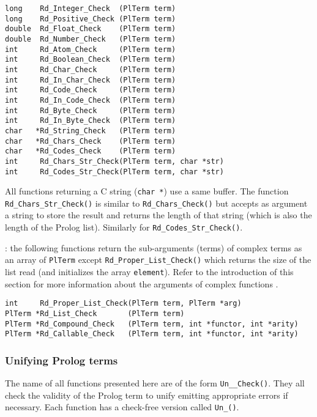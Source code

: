 \begin{Indentation}
\begin{verbatim}
long    Rd_Integer_Check  (PlTerm term)
long    Rd_Positive_Check (PlTerm term)
double  Rd_Float_Check    (PlTerm term)
double  Rd_Number_Check   (PlTerm term)
int     Rd_Atom_Check     (PlTerm term)
int     Rd_Boolean_Check  (PlTerm term)
int     Rd_Char_Check     (PlTerm term)
int     Rd_In_Char_Check  (PlTerm term)
int     Rd_Code_Check     (PlTerm term)
int     Rd_In_Code_Check  (PlTerm term)
int     Rd_Byte_Check     (PlTerm term)
int     Rd_In_Byte_Check  (PlTerm term)
char   *Rd_String_Check   (PlTerm term)
char   *Rd_Chars_Check    (PlTerm term)
char   *Rd_Codes_Check    (PlTerm term)
int     Rd_Chars_Str_Check(PlTerm term, char *str)
int     Rd_Codes_Str_Check(PlTerm term, char *str)
\end{verbatim}
\end{Indentation}

All functions returning a C string (\texttt{char *}) use a same buffer. The
function \texttt{Rd\_Chars\_Str\_Check()} is similar to
\texttt{Rd\_Chars\_Check()} but accepts as argument a string to store the
result and returns the length of that string (which is also the length of
the Prolog list). Similarly for \texttt{Rd\_Codes\_Str\_Check()}.

: the following functions return the sub-arguments
(terms) of complex terms as an array of \texttt{PlTerm} except
\texttt{Rd\_Proper\_List\_Check()} which returns the size of the list read
(and initializes the array \texttt{element}). Refer to the introduction of
this section for more information about the arguments of complex functions
.

\begin{Indentation}
\begin{verbatim}
int     Rd_Proper_List_Check(PlTerm term, PlTerm *arg)
PlTerm *Rd_List_Check       (PlTerm term)
PlTerm *Rd_Compound_Check   (PlTerm term, int *functor, int *arity)
PlTerm *Rd_Callable_Check   (PlTerm term, int *functor, int *arity)
\end{verbatim}
\end{Indentation}

\subsubsection{Unifying Prolog terms}
The name of all functions presented here are of the form
\texttt{Un\_\_Check()}. They all check the validity of the
Prolog term to unify emitting appropriate errors if necessary. Each function
has a check-free version called \texttt{Un\_()}.


